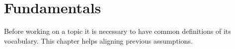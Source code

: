 \chapter{Fundamentals}

Before working on a topic it is necessary to have common definitions of its vocabulary. This chapter helps aligning previous assumptions.
